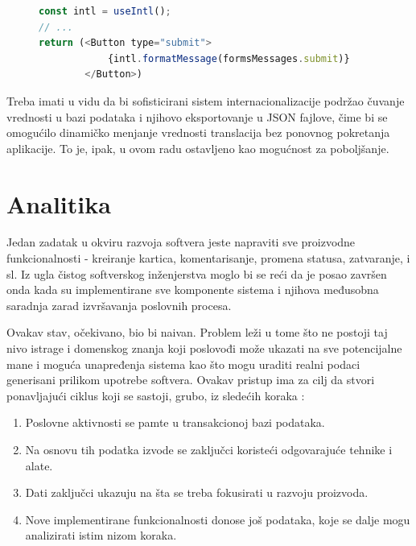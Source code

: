 \documentclass[12pt,oneside]{memoir}
\begin{document}
\begin{figure}[h]
\begin{lstlisting}[language=JavaScript, style=ES6, caption={Korišćenje poruka}, label={lst:messagesusage}]
const intl = useIntl();
// ...
return (<Button type="submit">
            {intl.formatMessage(formsMessages.submit)}
        </Button>)
\end{lstlisting}
\end{figure}

Treba imati u vidu da bi sofisticirani sistem internacionalizacije podržao čuvanje vrednosti u bazi podataka i njihovo eksportovanje u JSON fajlove, čime bi se omogućilo dinamičko menjanje vrednosti translacija bez ponovnog pokretanja aplikacije. To je, ipak, u ovom radu ostavljeno kao mogućnost za poboljšanje.


\chapter{Analitika}

Jedan zadatak u okviru razvoja softvera jeste napraviti sve proizvodne funkcionalnosti - kreiranje kartica, komentarisanje, promena statusa, zatvaranje, i sl. Iz ugla čistog softverskog inženjerstva moglo bi se reći da je posao završen onda kada su implementirane sve komponente sistema i njihova međusobna saradnja zarad izvršavanja poslovnih procesa.

Ovakav stav, očekivano, bio bi naivan. Problem leži u tome što ne postoji taj nivo istrage i domenskog znanja koji poslovođi može ukazati na sve potencijalne mane i moguća unapređenja sistema kao što mogu uraditi realni podaci generisani prilikom upotrebe softvera. Ovakav pristup ima za cilj da stvori ponavljajući ciklus koji se sastoji, grubo, iz sledećih koraka \cite{dataanalytics}:
\begin{enumerate}
    \item Poslovne aktivnosti se pamte u transakcionoj bazi podataka.
    \item Na osnovu tih podatka izvode se zaključci koristeći odgovarajuće tehnike i alate.
    \item Dati zaključci ukazuju na šta se treba fokusirati u razvoju proizvoda.
    \item Nove implementirane funkcionalnosti donose još podataka, koje se dalje mogu analizirati istim nizom koraka.
\end{enumerate}
\end{document}
